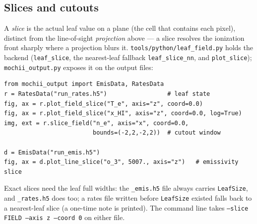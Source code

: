 \documentclass[english,a4paper]{my_memo}
\newcommand{\code}[1]{\texttt{#1}}
\begin{document}
\subsection{Slices and cutouts}
A \emph{slice} is the actual leaf value on a plane (the cell that contains
each pixel), distinct from the line-of-sight \emph{projection} above --- a
slice resolves the ionization front sharply where a projection blurs it.
\code{tools/python/leaf\_field.py} holds the backend
(\code{leaf\_slice}, the nearest-leaf fallback \code{leaf\_slice\_nn}, and
\code{plot\_slice}); \code{mochii\_output.py} exposes it on the output
files:
\begin{verbatim}
from mochii_output import EmisData, RatesData
r = RatesData("run_rates.h5")                 # leaf state
fig, ax = r.plot_field_slice("T_e", axis="z", coord=0.0)
fig, ax = r.plot_field_slice("x_HI", axis="z", coord=0.0, log=True)
img, ext = r.slice_field("n_e", axis="x", coord=0.0,
                         bounds=(-2,2,-2,2))  # cutout window

d = EmisData("run_emis.h5")
fig, ax = d.plot_line_slice("o_3", 5007., axis="z")   # emissivity slice
\end{verbatim}
Exact slices need the leaf full widths: the \code{\_emis.h5} file always
carries \code{LeafSize}, and \code{\_rates.h5} does too; a rates file
written before \code{LeafSize} existed falls back to a nearest-leaf
slice (a one-time note is printed).  The command line takes
\code{--slice FIELD --axis z --coord 0} on either file.
\end{document}

